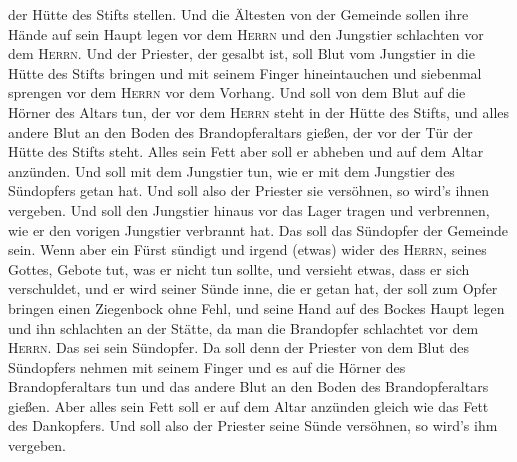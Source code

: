 der Hütte des Stifts stellen.  Und die Ältesten von der
Gemeinde sollen ihre Hände auf sein Haupt legen vor dem \textsc{Herrn}
und den Jungstier schlachten vor dem \textsc{Herrn}.  Und
der Priester, der gesalbt ist, soll Blut vom Jungstier in die Hütte des
Stifts bringen  und mit seinem Finger hineintauchen und
siebenmal sprengen vor dem \textsc{Herrn} vor dem Vorhang.
 Und soll von dem Blut auf die Hörner des Altars tun, der
vor dem \textsc{Herrn} steht in der Hütte des Stifts, und alles andere
Blut an den Boden des Brandopferaltars gießen, der vor der Tür der Hütte
des Stifts steht.  Alles sein Fett aber soll er abheben
und auf dem Altar anzünden.  Und soll mit dem Jungstier
tun, wie er mit dem Jungstier des Sündopfers getan hat. Und soll also
der Priester sie versöhnen, so wird's ihnen vergeben. 
Und soll den Jungstier hinaus vor das Lager tragen und verbrennen, wie
er den vorigen Jungstier verbrannt hat. Das soll das Sündopfer der
Gemeinde sein.  Wenn aber ein Fürst sündigt und irgend
(etwas) wider des \textsc{Herrn}, seines Gottes, Gebote tut, was er
nicht tun sollte, und versieht etwas, dass er sich verschuldet,
 und er wird seiner Sünde inne, die er getan hat, der
soll zum Opfer bringen einen Ziegenbock ohne Fehl,  und
seine Hand auf des Bockes Haupt legen und ihn schlachten an der Stätte,
da man die Brandopfer schlachtet vor dem \textsc{Herrn}. Das sei sein
Sündopfer.  Da soll denn der Priester von dem Blut des
Sündopfers nehmen mit seinem Finger und es auf die Hörner des
Brandopferaltars tun und das andere Blut an den Boden des
Brandopferaltars gießen.  Aber alles sein Fett soll er
auf dem Altar anzünden gleich wie das Fett des Dankopfers. Und soll also
der Priester seine Sünde versöhnen, so wird's ihm vergeben.

